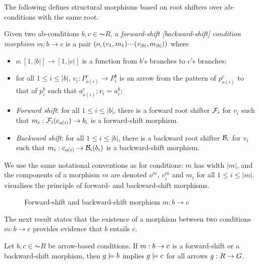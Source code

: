 The following defines structural morphisms based on root shifters over ab-conditions with the same root.

\begin{definition}
  Given two ab-conditions $b,c \in \AC{R}$, a \emph{forward-shift [backward-shift] condition morphism} $m: b \to c$ is a pair $(o,(v_1,m_1){\cdotp\mkern-2mu\cdotp\mkern-2mu\cdotp\mkern1mu} (v_{|b|},m_{|b|}))$ where
  \begin{itemize}[topsep=\smallskipamount]
  \item $o:[1,|b|]\to[1,|c|]$ is a function from $b$'s branches to $c$'s branches;
  \item for all $1\leq i\leq |b|$, $v_i:P^c_{o(i)}\to P^b_i$ is an arrow from the pattern of $p^c_{o(i)}$ to that of $p^b_i$ such that $a^c_{o(i)};v_i=a^b_i$;
  \item\emph{Forward shift}: for all $1\leq i\leq |b|$, there is a forward root shifter $\mathcal{F}_i$ for $v_i$ such that $m_i:\mathcal{F}_i(c_{o(i)})\to b_i$ is a forward-shift morphism.
  \item\emph{Backward shift}: for all $1\leq i\leq |b|$, there is a backward root shifter $\mathcal{B}_i$ for $v_i$ such that $m_i:c_{o(i)}\to \mathcal{B}_i(b_i)$ is a backward-shift morphism.
  \end{itemize}
\end{definition}
%
We use the same notational conventions as for conditions: $m$ has width $|m|$, and the components of a morphism $m$ are denoted $o^m$, $v^m_i$ and $m_i$ for all $1\leq i\leq |m|$.  visualises the principle of forward- and backward-shift morphisms.
%
\begin{figure}
\centering

\caption{Forward-shift and backward-shift morphism $m:b\to c$}
\end{figure}

The next result states that the existence of a morphism between two conditions $m: b \to c$ provides evidence that $b$ entails $c$.

\begin{proposition}
Let $b,c \in \AC{R}$  be arrow-based conditions. If $m:b\rightarrow c$ is a forward-shift or a backward-shift morphism, then $g\models b$ implies $g \models c$ for all arrows $g:R\rightarrow G$. 
\end{proposition}

